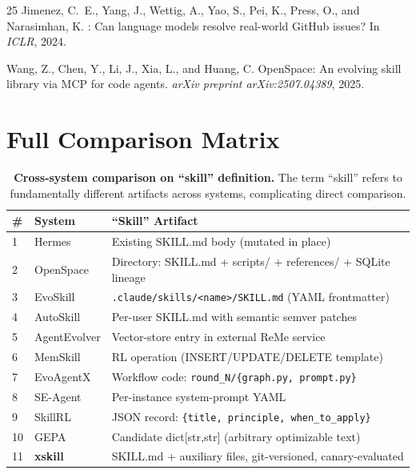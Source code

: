 \documentclass{article}
\begin{document}
\begin{thebibliography}{25}
Jimenez, C.~E., Yang, J., Wettig, A., Yao, S., Pei, K., Press, O., and Narasimhan, K.
: Can language models resolve real-world {GitHub} issues?
\newblock In \emph{ICLR}, 2024.

Wang, Z., Chen, Y., Li, J., Xia, L., and Huang, C.
\newblock OpenSpace: An evolving skill library via {MCP} for code agents.
\newblock \emph{arXiv preprint arXiv:2507.04389}, 2025.

\end{thebibliography}

\newpage
\appendix

\section{Full Comparison Matrix}
\label{app:matrix}

\begin{table}[h!]
\centering
\caption{\textbf{Cross-system comparison on ``skill'' definition.} The term ``skill'' refers to fundamentally different artifacts across systems, complicating direct comparison.}
\label{tab:skill-def}
\small
\begin{tabular}{@{}llp{6cm}@{}}
\toprule
\textbf{\#} & \textbf{System} & \textbf{``Skill'' Artifact} \\
\midrule
1 & Hermes & Existing SKILL.md body (mutated in place) \\
2 & OpenSpace & Directory: SKILL.md + scripts/ + references/ + SQLite lineage \\
3 & EvoSkill & \texttt{.claude/skills/<name>/SKILL.md} (YAML frontmatter) \\
4 & AutoSkill & Per-user SKILL.md with semantic semver patches \\
5 & AgentEvolver & Vector-store entry in external ReMe service \\
6 & MemSkill & RL operation (INSERT/UPDATE/DELETE template) \\
7 & EvoAgentX & Workflow code: \texttt{round\_N/\{graph.py, prompt.py\}} \\
8 & SE-Agent & Per-instance system-prompt YAML \\
9 & SkillRL & JSON record: \texttt{\{title, principle, when\_to\_apply\}} \\
10 & GEPA & Candidate dict[str,str] (arbitrary optimizable text) \\
\midrule
11 & \textbf{xskill} & SKILL.md + auxiliary files, git-versioned, canary-evaluated \\
\bottomrule
\end{tabular}
\end{table}
\end{document}
